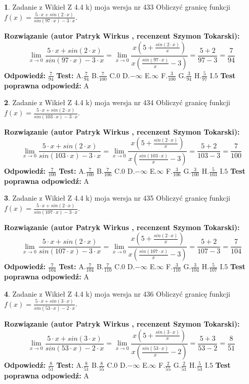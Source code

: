 \documentclass[12pt, a4paper]{article}
\theoremstyle{definition} %
\newtheorem{zad}{}
\newcommand{\zadStart}[1]{\begin{zad}#1\newline}
\newcommand{\zadStop}{\end{zad}}
\newcommand{\rozwStart}[2]{\noindent \textbf{Rozwiązanie (autor #1 , recenzent #2): }\newline}
\newcommand{\rozwStop}{\newline}
\newcommand{\odpStart}{\noindent \textbf{Odpowiedź:}\newline}
\newcommand{\odpStop}{\newline}
\newcommand{\testStart}{\noindent \textbf{Test:}\newline}
\newcommand{\testStop}{\newline}
\newcommand{\kluczStart}{\noindent \textbf{Test poprawna odpowiedź:}\newline}
\newcommand{\kluczStop}{\newline}
\begin{document}
\zadStart{Zadanie z Wikieł Z 4.4 k) moja wersja nr 433}
Obliczyć granicę funkcji $f(x)=\frac{5\cdot x +sin(2\cdot x)}{sin(97\cdot x) -3\cdot x}$.
\zadStop
\rozwStart{Patryk Wirkus}{Szymon Tokarski}
$$\lim\limits_{x\to 0}\frac{5\cdot x +sin(2\cdot x)}{sin(97\cdot x) -3\cdot x}
=\lim\limits_{x\to 0}\frac{x(5+\frac{sin(2\cdot x)}{x})}{x(\frac{sin(97\cdot x)}{x}-3)}
=\frac{5+2}{97-3} = \frac{7}{94}$$
\rozwStop
\odpStart
$\frac{7}{94}$
\odpStop
\testStart
A.$\frac{7}{94}$
B.$\frac{7}{100}$
C.$0$
D.$-\infty$
E.$\infty$
F.$\frac{3}{100}$
G.$\frac{3}{94}$
H.$\frac{5}{97}$
I.$5$
\testStop
\kluczStart
A
\kluczStop



\zadStart{Zadanie z Wikieł Z 4.4 k) moja wersja nr 434}
Obliczyć granicę funkcji $f(x)=\frac{5\cdot x +sin(2\cdot x)}{sin(103\cdot x) -3\cdot x}$.
\zadStop
\rozwStart{Patryk Wirkus}{Szymon Tokarski}
$$\lim\limits_{x\to 0}\frac{5\cdot x +sin(2\cdot x)}{sin(103\cdot x) -3\cdot x}
=\lim\limits_{x\to 0}\frac{x(5+\frac{sin(2\cdot x)}{x})}{x(\frac{sin(103\cdot x)}{x}-3)}
=\frac{5+2}{103-3} = \frac{7}{100}$$
\rozwStop
\odpStart
$\frac{7}{100}$
\odpStop
\testStart
A.$\frac{7}{100}$
B.$\frac{7}{106}$
C.$0$
D.$-\infty$
E.$\infty$
F.$\frac{3}{106}$
G.$\frac{3}{100}$
H.$\frac{5}{103}$
I.$5$
\testStop
\kluczStart
A
\kluczStop



\zadStart{Zadanie z Wikieł Z 4.4 k) moja wersja nr 435}
Obliczyć granicę funkcji $f(x)=\frac{5\cdot x +sin(2\cdot x)}{sin(107\cdot x) -3\cdot x}$.
\zadStop
\rozwStart{Patryk Wirkus}{Szymon Tokarski}
$$\lim\limits_{x\to 0}\frac{5\cdot x +sin(2\cdot x)}{sin(107\cdot x) -3\cdot x}
=\lim\limits_{x\to 0}\frac{x(5+\frac{sin(2\cdot x)}{x})}{x(\frac{sin(107\cdot x)}{x}-3)}
=\frac{5+2}{107-3} = \frac{7}{104}$$
\rozwStop
\odpStart
$\frac{7}{104}$
\odpStop
\testStart
A.$\frac{7}{104}$
B.$\frac{7}{110}$
C.$0$
D.$-\infty$
E.$\infty$
F.$\frac{3}{110}$
G.$\frac{3}{104}$
H.$\frac{5}{107}$
I.$5$
\testStop
\kluczStart
A
\kluczStop



\zadStart{Zadanie z Wikieł Z 4.4 k) moja wersja nr 436}
Obliczyć granicę funkcji $f(x)=\frac{5\cdot x +sin(3\cdot x)}{sin(53\cdot x) -2\cdot x}$.
\zadStop
\rozwStart{Patryk Wirkus}{Szymon Tokarski}
$$\lim\limits_{x\to 0}\frac{5\cdot x +sin(3\cdot x)}{sin(53\cdot x) -2\cdot x}
=\lim\limits_{x\to 0}\frac{x(5+\frac{sin(3\cdot x)}{x})}{x(\frac{sin(53\cdot x)}{x}-2)}
=\frac{5+3}{53-2} = \frac{8}{51}$$
\rozwStop
\odpStart
$\frac{8}{51}$
\odpStop
\testStart
A.$\frac{8}{51}$
B.$\frac{8}{55}$
C.$0$
D.$-\infty$
E.$\infty$
F.$\frac{2}{55}$
G.$\frac{2}{51}$
H.$\frac{5}{53}$
I.$5$
\testStop
\kluczStart
A
\kluczStop
\end{document}

